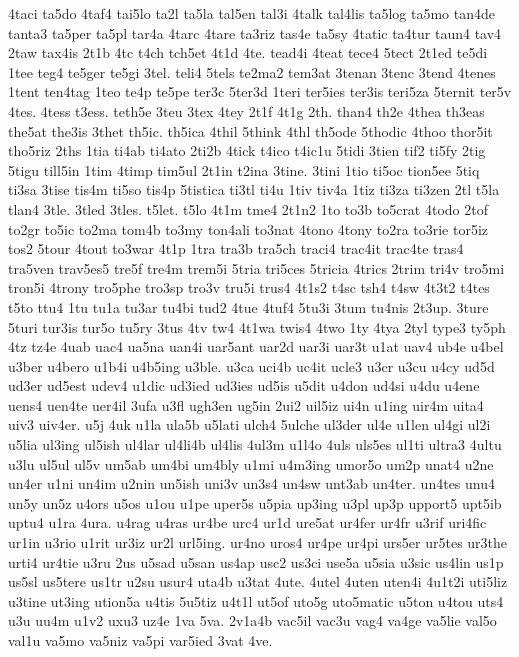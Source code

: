 {4taci
ta5do
4taf4
tai5lo
ta2l
ta5la
tal5en
tal3i
4talk
tal4lis
ta5log
ta5mo
tan4de
tanta3
ta5per
ta5pl
tar4a
4tarc
4tare
ta3riz
tas4e
ta5sy
4tatic
ta4tur
taun4
tav4
2taw
tax4is
2t1b
4tc
t4ch
tch5et
4t1d
4te.
tead4i
4teat
tece4
5tect
2t1ed
te5di
1tee
teg4
te5ger
te5gi
3tel.
teli4
5tels
te2ma2
tem3at
3tenan
3tenc
3tend
4tenes
1tent
ten4tag
1teo
te4p
te5pe
ter3c
5ter3d
1teri
ter5ies
ter3is
teri5za
5ternit
ter5v
4tes.
4tess
t3ess.
teth5e
3teu
3tex
4tey
2t1f
4t1g
2th.
than4
th2e
4thea
th3eas
the5at
the3is
3thet
th5ic.
th5ica
4thil
5think
4thl
th5ode
5thodic
4thoo
thor5it
tho5riz
2ths
1tia
ti4ab
ti4ato
2ti2b
4tick
t4ico
t4ic1u
5tidi
3tien
tif2
ti5fy
2tig
5tigu
till5in
1tim
4timp
tim5ul
2t1in
t2ina
3tine.
3tini
1tio
ti5oc
tion5ee
5tiq
ti3sa
3tise
tis4m
ti5so
tis4p
5tistica
ti3tl
ti4u
1tiv
tiv4a
1tiz
ti3za
ti3zen
2tl
t5la
tlan4
3tle.
3tled
3tles.
t5let.
t5lo
4t1m
tme4
2t1n2
1to
to3b
to5crat
4todo
2tof
to2gr
to5ic
to2ma
tom4b
to3my
ton4ali
to3nat
4tono
4tony
to2ra
to3rie
tor5iz
tos2
5tour
4tout
to3war
4t1p
1tra
tra3b
tra5ch
traci4
trac4it
trac4te
tras4
tra5ven
trav5es5
tre5f
tre4m
trem5i
5tria
tri5ces
5tricia
4trics
2trim
tri4v
tro5mi
tron5i
4trony
tro5phe
tro3sp
tro3v
tru5i
trus4
4t1s2
t4sc
tsh4
t4sw
4t3t2
t4tes
t5to
ttu4
1tu
tu1a
tu3ar
tu4bi
tud2
4tue
4tuf4
5tu3i
3tum
tu4nis
2t3up.
3ture
5turi
tur3is
tur5o
tu5ry
3tus
4tv
tw4
4t1wa
twis4
4two
1ty
4tya
2tyl
type3
ty5ph
4tz
tz4e
4uab
uac4
ua5na
uan4i
uar5ant
uar2d
uar3i
uar3t
u1at
uav4
ub4e
u4bel
u3ber
u4bero
u1b4i
u4b5ing
u3ble.
u3ca
uci4b
uc4it
ucle3
u3cr
u3cu
u4cy
ud5d
ud3er
ud5est
udev4
u1dic
ud3ied
ud3ies
ud5is
u5dit
u4don
ud4si
u4du
u4ene
uens4
uen4te
uer4il
3ufa
u3fl
ugh3en
ug5in
2ui2
uil5iz
ui4n
u1ing
uir4m
uita4
uiv3
uiv4er.
u5j
4uk
u1la
ula5b
u5lati
ulch4
5ulche
ul3der
ul4e
u1len
ul4gi
ul2i
u5lia
ul3ing
ul5ish
ul4lar
ul4li4b
ul4lis
4ul3m
u1l4o
4uls
uls5es
ul1ti
ultra3
4ultu
u3lu
ul5ul
ul5v
um5ab
um4bi
um4bly
u1mi
u4m3ing
umor5o
um2p
unat4
u2ne
un4er
u1ni
un4im
u2nin
un5ish
uni3v
un3s4
un4sw
unt3ab
un4ter.
un4tes
unu4
un5y
un5z
u4ors
u5os
u1ou
u1pe
uper5s
u5pia
up3ing
u3pl
up3p
upport5
upt5ib
uptu4
u1ra
4ura.
u4rag
u4ras
ur4be
urc4
ur1d
ure5at
ur4fer
ur4fr
u3rif
uri4fic
ur1in
u3rio
u1rit
ur3iz
ur2l
url5ing.
ur4no
uros4
ur4pe
ur4pi
urs5er
ur5tes
ur3the
urti4
ur4tie
u3ru
2us
u5sad
u5san
us4ap
usc2
us3ci
use5a
u5sia
u3sic
us4lin
us1p
us5sl
us5tere
us1tr
u2su
usur4
uta4b
u3tat
4ute.
4utel
4uten
uten4i
4u1t2i
uti5liz
u3tine
ut3ing
ution5a
u4tis
5u5tiz
u4t1l
ut5of
uto5g
uto5matic
u5ton
u4tou
uts4
u3u
uu4m
u1v2
uxu3
uz4e
1va
5va.
2v1a4b
vac5il
vac3u
vag4
va4ge
va5lie
val5o
val1u
va5mo
va5niz
va5pi
var5ied
3vat
4ve.
}
